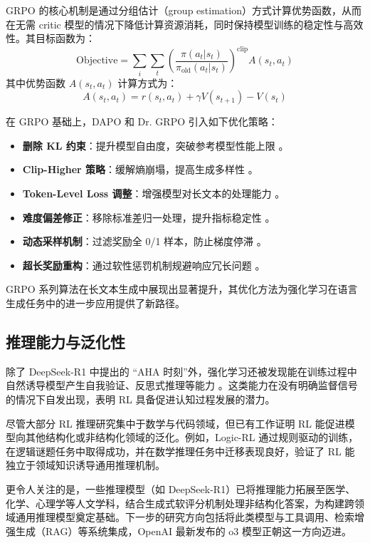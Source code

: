 \documentclass{pkuthesis}
\begin{document}
GRPO 的核心机制是通过分组估计（group estimation）方式计算优势函数，从而在无需 critic 模型的情况下降低计算资源消耗，同时保持模型训练的稳定性与高效性。其目标函数为：
\begin{equation}
\text{Objective} = \sum_{i} \sum_{t} \left( \frac{\pi(a_t|s_t)}{\pi_{\text{old}}(a_t|s_t)} \right)^{\text{clip}} A(s_t, a_t)
\end{equation}
其中优势函数 \( A(s_t, a_t) \) 计算方式为：
\begin{equation}
A(s_t, a_t) = r(s_t, a_t) + \gamma V(s_{t+1}) - V(s_t)
\end{equation}

在 GRPO 基础上，DAPO 和 Dr. GRPO 引入如下优化策略：
\begin{itemize}
    \item \textbf{删除 KL 约束}：提升模型自由度，突破参考模型性能上限 \cite{yu2025dapo}。
    \item \textbf{Clip-Higher 策略}：缓解熵崩塌，提高生成多样性 \cite{yu2025dapo}。
    \item \textbf{Token-Level Loss 调整}：增强模型对长文本的处理能力 \cite{yu2025dapo}。
    \item \textbf{难度偏差修正}：移除标准差归一处理，提升指标稳定性 \cite{liu2025understanding}。
    \item \textbf{动态采样机制}：过滤奖励全 0/1 样本，防止梯度停滞 \cite{yu2025dapo}。
    \item \textbf{超长奖励重构}：通过软性惩罚机制规避响应冗长问题 \cite{yu2025dapo}。
\end{itemize}

GRPO 系列算法在长文本生成中展现出显著提升，其优化方法为强化学习在语言生成任务中的进一步应用提供了新路径。

\subsection{推理能力与泛化性}

除了 DeepSeek-R1 中提出的 “AHA 时刻”外，强化学习还被发现能在训练过程中自然诱导模型产生自我验证、反思式推理等能力 \cite{el2025competitive}。这类能力在没有明确监督信号的情况下自发出现，表明 RL 具备促进认知过程发展的潜力。

尽管大部分 RL 推理研究集中于数学与代码领域，但已有工作证明 RL 能促进模型向其他结构化或非结构化领域的泛化。例如，Logic-RL\cite{xie2025logic} 通过规则驱动的训练，在逻辑谜题任务中取得成功，并在数学推理任务中迁移表现良好，验证了 RL 能独立于领域知识诱导通用推理机制。

更令人关注的是，一些推理模型（如 DeepSeek-R1\cite{guo2025deepseek}）已将推理能力拓展至医学、化学、心理学等人文学科，结合生成式软评分机制处理非结构化答案，为构建跨领域通用推理模型奠定基础。下一步的研究方向包括将此类模型与工具调用、检索增强生成（RAG）等系统集成，OpenAI 最新发布的 o3 模型正朝这一方向迈进。
\end{document}
